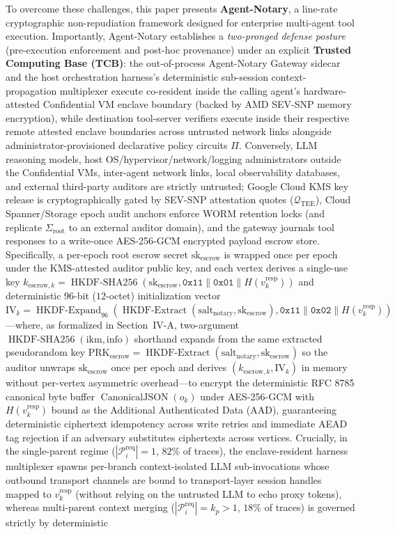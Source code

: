 \documentclass[conference,10pt]{IEEEtran}
\begin{document}
To overcome these challenges, this paper presents \textbf{Agent-Notary}, a line-rate cryptographic non-repudiation framework designed for enterprise multi-agent tool execution. Importantly, Agent-Notary establishes a \emph{two-pronged defense posture} (pre-execution enforcement and post-hoc provenance) under an explicit \textbf{Trusted Computing Base (TCB)}: the out-of-process Agent-Notary Gateway sidecar and the host orchestration harness's deterministic sub-session context-propagation multiplexer execute co-resident inside the calling agent's hardware-attested Confidential VM enclave boundary (backed by AMD SEV-SNP memory encryption), while destination tool-server verifiers execute inside their respective remote attested enclave boundaries across untrusted network links alongside administrator-provisioned declarative policy circuits $\Pi$. Conversely, LLM reasoning models, host OS/hypervisor/network/logging administrators outside the Confidential VMs, inter-agent network links, local observability databases, and external third-party auditors are strictly untrusted; Google Cloud KMS key release is cryptographically gated by SEV-SNP attestation quotes ($\mathcal{Q}_{\text{TEE}}$), Cloud Spanner/Storage epoch audit anchors enforce WORM retention locks (and replicate $\Sigma_{\text{root}}$ to an external auditor domain), and the gateway journals tool responses to a write-once AES-256-GCM encrypted payload escrow store. Specifically, a per-epoch root escrow secret $\text{sk}_{\text{escrow}}$ is wrapped once per epoch under the KMS-attested auditor public key, and each vertex derives a single-use key $k_{\text{escrow},k} = \operatorname{HKDF-SHA256}(\text{sk}_{\text{escrow}}, \mathtt{0x11} \parallel \mathtt{0x01} \parallel H(v_k^{\text{resp}}))$ and deterministic 96-bit ($12$-octet) initialization vector $\text{IV}_k = \operatorname{HKDF-Expand}_{96}(\operatorname{HKDF-Extract}(\text{salt}_{\text{notary}}, \text{sk}_{\text{escrow}}), \mathtt{0x11} \parallel \mathtt{0x02} \parallel H(v_k^{\text{resp}}))$---where, as formalized in Section~IV-A, two-argument $\operatorname{HKDF-SHA256}(\text{ikm}, \text{info})$ shorthand expands from the same extracted pseudorandom key $\text{PRK}_{\text{escrow}} = \operatorname{HKDF-Extract}(\text{salt}_{\text{notary}}, \text{sk}_{\text{escrow}})$ so the auditor unwraps $\text{sk}_{\text{escrow}}$ once per epoch and derives $(k_{\text{escrow},k}, \text{IV}_k)$ in memory without per-vertex asymmetric overhead---to encrypt the deterministic RFC 8785 canonical byte buffer $\operatorname{CanonicalJSON}(o_k)$ under AES-256-GCM with $H(v_k^{\text{resp}})$ bound as the Additional Authenticated Data (AAD), guaranteeing deterministic ciphertext idempotency across write retries and immediate AEAD tag rejection if an adversary substitutes ciphertexts across vertices. Crucially, in the single-parent regime ($|\mathcal{P}_i^{\text{req}}| = 1$, $82\%$ of traces), the enclave-resident harness multiplexer spawns per-branch context-isolated LLM sub-invocations whose outbound transport channels are bound to transport-layer session handles mapped to $v_k^{\text{resp}}$ (without relying on the untrusted LLM to echo proxy tokens), whereas multi-parent context merging ($|\mathcal{P}_i^{\text{req}}| = k_p > 1$, $18\%$ of traces) is governed strictly by deterministic 
\end{document}
